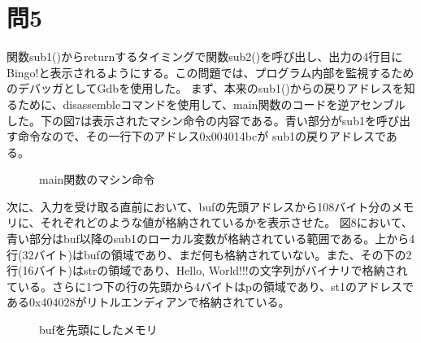 \documentclass[dvipdfmx,autodetect-engine,titlepage]{jsarticle}
\begin{document}
\section*{問5}
関数sub1()からreturnするタイミングで関数sub2()を呼び出し、出力の4行目にBingo!と表示されるようにする。この問題では、プログラム内部を監視するためのデバッガとしてGdbを使用した。
まず、本来のsub1()からの戻りアドレスを知るために、disassembleコマンドを使用して、main関数のコードを逆アセンブルした。下の図7は表示されたマシン命令の内容である。青い部分がsub1を呼び出す命令なので、その一行下のアドレス0x004014bcが
sub1の戻りアドレスである。
\begin{figure}[H]
  \centering
  \caption{main関数のマシン命令}\label{fig:図11}
\end{figure}

次に、入力を受け取る直前において、bufの先頭アドレスから108バイト分のメモリに、それぞれどのような値が格納されているかを表示させた。
図8において、青い部分はbuf以降のsub1のローカル変数が格納されている範囲である。上から4行(32バイト)はbufの領域であり、まだ何も格納されていない。また、その下の2行(16バイト)はstrの領域であり、Hello, World!!!の文字列がバイナリで格納されている。さらに1つ下の行の先頭から4バイトはpの領域であり、st1のアドレスである0x404028がリトルエンディアンで格納されている。
\begin{figure}[H]
  \centering
  \caption{bufを先頭にしたメモリ}\label{fig:図12}
\end{figure}
\end{document}

